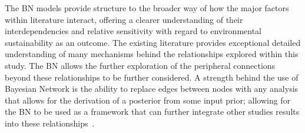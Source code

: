 The BN models provide structure to the broader way of how the major factors within literature interact, offering a clearer understanding of their interdependencies and relative sensitivity with regard to environmental sustainability as an outcome. The existing literature provides exceptional detailed understanding of many mechanisms behind the relationships explored within this study. The BN allows the further exploration of the peripheral connections beyond these relationships to be further considered. A strength behind the use of Bayesian Network is the ability to replace edges between nodes with any analysis that allows for the derivation of a posterior from some input prior; allowing for the BN to be used as a framework that can further integrate other studies results into these relationships~\cite{kimphuctranMachineLearningProbabilistic2022,kollerObjectOrientedBayesianNetworks1997,korbBayesianArtificialIntelligence2011}.

